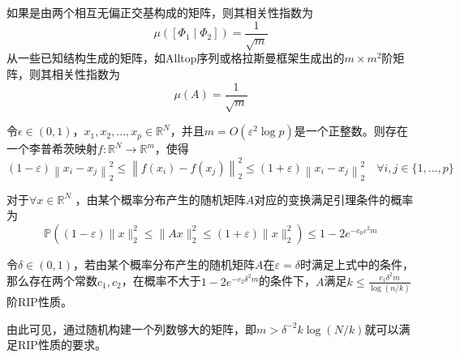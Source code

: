 如果是由两个相互无偏正交基构成的矩阵，则其相关性指数为
\begin{equation}
    \mu\left(\left[\Phi_1 \mid \Phi_2\right]\right)=\frac{1}{\sqrt{m}}
\end{equation}
从一些已知结构生成的矩阵，如Alltop序列或格拉斯曼框架生成出的$m\times m^2$阶矩阵，则其相关性指数为
\begin{equation}
    \mu(A)=\frac{1}{\sqrt{m}}
\end{equation}
\begin{lemma}
    令$\epsilon \in \left( 0,1\right)$，$x_1,x_2,...,x_p\in \mathbb{R}^N$，并且$m=O\left(\varepsilon^2
    \log p\right)$是一个正整数。则存在一个李普希茨映射$f:\mathbb{R}^N \rightarrow \mathbb{R}^m$，使得
    \begin{equation}
        (1-\varepsilon)\left\|x_i-x_j\right\|_2^2 \leq\left\|f\left(x_i\right)-f\left(x_j\right)\right\|_2^2 
        \leq(1+\varepsilon)\left\|x_i-x_j\right\|_2^2 \quad \forall i,j \in\{1,\ldots,p\}
    \end{equation}
\end{lemma}
对于$\forall x \in \mathbb{R}^N$ ，由某个概率分布产生的随机矩阵$A$对应的变换满足引理条件的概率为
\begin{equation}
    \mathbb{P}\left((1-\varepsilon)\|x\|_2^2 \leq\|A x\|_2^2 \leq(1+\varepsilon)\|x\|_2^2\right) \leq 1-2 e^{-c_0 \varepsilon^2 m}
\end{equation}
\begin{theorem}
    令$\delta \in (0,1)$，若由某个概率分布产生的随机矩阵$A$在$\varepsilon =\delta$时满足上式中的条件，
    那么存在两个常数$c_1,c_2$，在概率不大于$1-2 e^{-c_2 \delta^2 m}$的条件下，$A$满足$k \leq  \frac{c_1 \delta^2m}{\log (n / k)}$阶RIP性质。
\end{theorem}
由此可见，通过随机构建一个列数够大的矩阵，即$m>\delta^{-2} k \log (N / k)$就可以满足RIP性质的要求。
